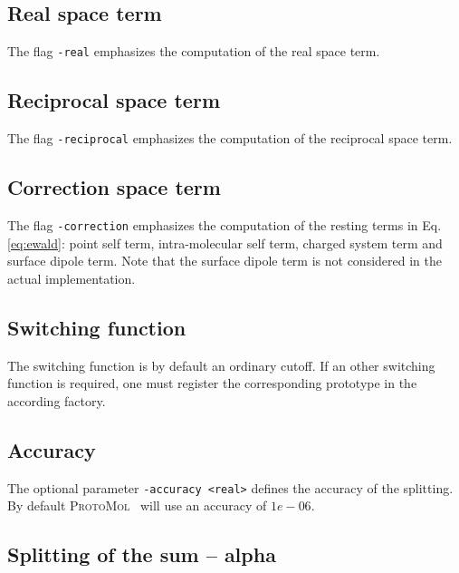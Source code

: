 \documentclass[11pt]{article}
\newcommand{\ProtoMol}{\textsc{ProtoMol }}
\begin{document}
\subsection{Real space term}

The flag \texttt{-real} emphasizes the computation of the real space term.

\subsection{Reciprocal space term}

The flag \texttt{-reciprocal} emphasizes the computation of the reciprocal space term.

\subsection{Correction  space term}

The flag \texttt{-correction} emphasizes the computation of the
resting terms in Eq. \ref{eq:ewald}: 
point self term, intra-molecular self term, charged system term
and surface dipole term. Note that the surface dipole term is not considered in the actual implementation.

\subsection{Switching function}
The switching function is by default an ordinary cutoff. If an other
switching function is required, one must register the corresponding
prototype in the according factory.

\subsection{Accuracy}

The optional parameter \texttt{-accuracy <real>} defines the accuracy
of the splitting. By default \ProtoMol\ will use an accuracy of
$1e-06$.

\subsection{Splitting of the sum -- alpha}
\end{document}

